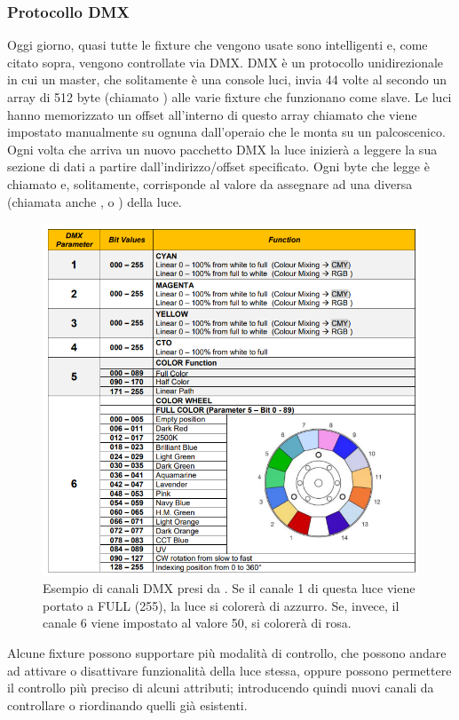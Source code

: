 \documentclass[main.tex]{subfiles}
\begin{document}
\subsubsection{Protocollo DMX}\label{subsec:1_1_dmx}
Oggi giorno, quasi tutte le fixture che vengono usate sono intelligenti e, come citato sopra, vengono controllate via DMX. DMX è un protocollo unidirezionale in cui un master, che solitamente è una console luci, invia 44 volte al secondo un array di 512 byte (chiamato ) alle varie fixture che funzionano come slave. Le luci hanno memorizzato un offset all'interno di questo array chiamato  che viene impostato manualmente su ognuna dall'operaio che le monta su un palcoscenico. Ogni volta che arriva un nuovo pacchetto DMX la luce inizierà a leggere la sua sezione di dati a partire dall'indirizzo/offset specificato. Ogni byte che legge è chiamato  e, solitamente, corrisponde al valore da assegnare ad una diversa  (chiamata anche , o ) della luce.
\begin{figure}[H]
    \centering
    \includegraphics[width=0.65\linewidth]{img/introduzione/dmxChannelDescExample.png}
    \caption{Esempio di canali DMX presi da \cite{fig_1_dmxChart}. Se il canale 1 di questa luce viene portato a FULL (255), la luce si colorerà di azzurro. Se, invece, il canale 6 viene impostato al valore 50, si colorerà di rosa.}
    \label{fig:1_dmxChannelsExample}
\end{figure}

\noindent Alcune fixture possono supportare più modalità di controllo, che possono andare ad attivare o disattivare funzionalità della luce stessa, oppure possono permettere il controllo più preciso di alcuni attributi; introducendo quindi nuovi canali da controllare o riordinando quelli già esistenti. 
\end{document}
